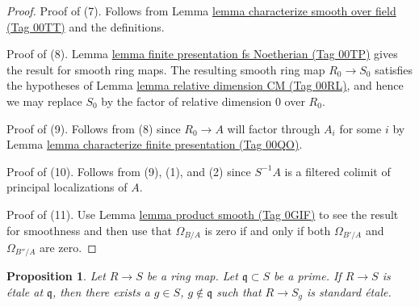 \documentclass{amsart}
\theoremstyle{plain}
\newtheorem{proposition}[subsection]{Proposition}
\theoremstyle{definition}
\theoremstyle{remark}
\numberwithin{equation}{subsection}
\begin{document}
\begin{proof}
\medskip\noindent
Proof of (7). Follows from Lemma \href{https://stacks.math.columbia.edu/tag/00TT}{lemma characterize smooth over field (Tag 00TT)}
and the definitions.

\medskip\noindent
Proof of (8). Lemma \href{https://stacks.math.columbia.edu/tag/00TP}{lemma finite presentation fs Noetherian (Tag 00TP)}
gives the result for smooth ring maps. The resulting smooth ring map
$R_0 \to S_0$ satisfies the
hypotheses of Lemma \href{https://stacks.math.columbia.edu/tag/00RL}{lemma relative dimension CM (Tag 00RL)}, and hence we may
replace $S_0$ by the factor of relative dimension $0$ over $R_0$.

\medskip\noindent
Proof of (9). Follows from (8) since $R_0 \to A$ will factor through
$A_i$ for some $i$ by Lemma \href{https://stacks.math.columbia.edu/tag/00QO}{lemma characterize finite presentation (Tag 00QO)}.

\medskip\noindent
Proof of (10). Follows from (9), (1), and (2) since $S^{-1}A$ is a
filtered colimit of principal localizations of $A$.

\medskip\noindent
Proof of (11). Use Lemma \href{https://stacks.math.columbia.edu/tag/0GIF}{lemma product smooth (Tag 0GIF)} to see the
result for smoothness and then use that $\Omega_{B/A}$
is zero if and only if both $\Omega_{B'/A}$ and $\Omega_{B''/A}$
are zero.
\end{proof}


\begin{proposition}
\label{proposition-etale-locally-standard}
Let $R \to S$ be a ring map. Let $\mathfrak q \subset S$ be a prime.
If $R \to S$ is \'etale at $\mathfrak q$, then there exists
a $g \in S$, $g \not \in \mathfrak q$ such that $R \to S_g$
is standard \'etale.
\end{proposition}
\end{document}
